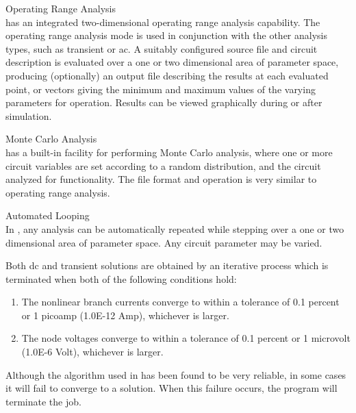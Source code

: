 \begin{description}
\item{Operating Range Analysis}\\
{\WRspice} has an integrated two-dimensional operating range analysis
capability.  The operating range analysis mode is used in conjunction
with the other analysis types, such as transient or ac.  A suitably
configured source file and circuit description is evaluated over a one
or two dimensional area of parameter space, producing (optionally) an
output file describing the results at each evaluated point, or vectors
giving the minimum and maximum values of the varying parameters for
operation.  Results can be viewed graphically during or after
simulation.

\item{Monte Carlo Analysis}\\
{\WRspice} has a built-in facility for performing Monte Carlo analysis,
where one or more circuit variables are set according to a random
distribution, and the circuit analyzed for functionality.  The file
format and operation is very similar to operating range analysis.

\item{Automated Looping}\\
In {\WRspice}, any analysis can be automatically repeated while
stepping over a one or two dimensional area of parameter space.  Any
circuit parameter may be varied.
\end{description}


Both dc and transient solutions are obtained by an iterative process
which is terminated when both of the following conditions hold:
\begin{enumerate}
\item The nonlinear branch currents converge to within a tolerance of
0.1 percent or 1 picoamp (1.0E-12 Amp), whichever is larger.
\item The node voltages converge to within a tolerance of 0.1 percent or 1
microvolt (1.0E-6 Volt), whichever is larger.
\end{enumerate}

Although the algorithm used in {\WRspice} has been found to be very
reliable, in some cases it will fail to converge to a solution.  When
this failure occurs, the program will terminate the job.

